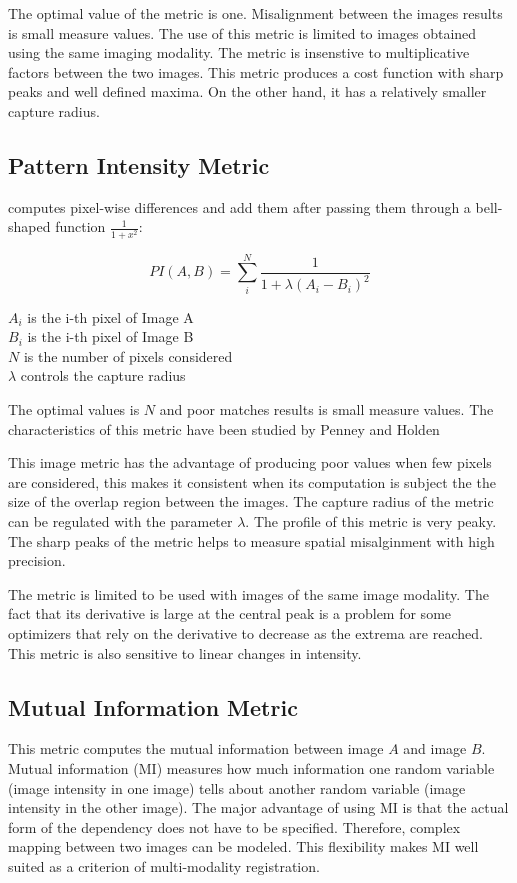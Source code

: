 The optimal value of the metric is one. Misalignment between the images results
is small measure values. The use of this metric is limited to images obtained
using the same imaging modality. The metric is insenstive to multiplicative
factors between the two images. This metric produces a cost function with sharp
peaks and well defined maxima. On the other hand, it has a relatively smaller
capture radius.

\subsection{Pattern Intensity Metric}
\label{sec:PatternIntensityMetric}
 computes pixel-wise differences and add them 
after passing them through a bell-shaped function $\frac{1}{1+x^2}$:

\begin{equation}
PI(A,B) =  \sum_i^N \frac{ 1 }{ 1 + \lambda \left( A_i - B_i \right) ^ 2 }
\end{equation}
\begin{center}
$A_i$ is the i-th pixel of Image A \\
$B_i$ is the i-th pixel of Image B \\
$N$ is the number of pixels considered \\
$\lambda$ controls the capture radius
\end{center}

The optimal values is $N$ and poor matches results is small measure values.
The characteristics of this metric have been studied by Penney and Holden
\cite{Holden1999}\cite{Penney1998}

This image metric has the advantage of producing poor values when few pixels
are considered, this makes it consistent when its computation is subject the
the size of the overlap region between the images. The capture radius of the
metric can be regulated with the parameter $\lambda$.  The profile of this
metric is very peaky. The sharp peaks of the metric helps
to measure spatial misalginment with high precision.

The metric is limited to be used with images of the same image modality.  The
fact that its derivative is large at the central peak is a problem for some
optimizers that rely on the derivative to decrease as the extrema are reached.
This metric is also sensitive to linear changes in intensity.


\subsection{Mutual Information Metric}
\label{sec:MutualInformationMetric}
This metric computes the mutual information between image $A$ and image $B$.
Mutual information (MI) measures how much information one random variable
(image intensity in one image) tells about another random variable 
(image intensity in the other image). The major advantage of using
MI is that the actual form of the dependency does not have to be specified. 
Therefore, complex mapping between two images can be modeled. 
This flexibility makes MI well suited as a criterion of multi-modality
registration.

